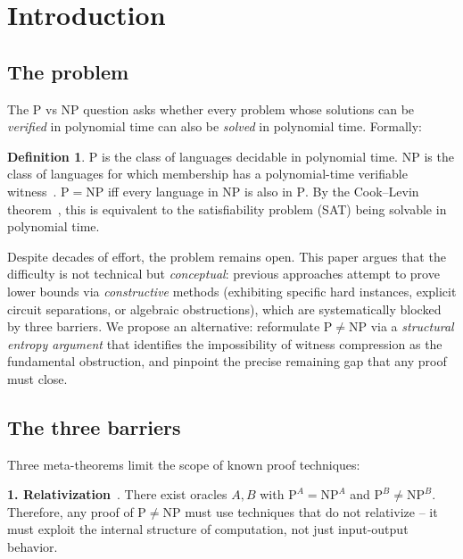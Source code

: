\documentclass[aps,prd,twocolumn,superscriptaddress,nofootinbib]{revtex4-2}
\theoremstyle{definition}
\newtheorem{definition}[theorem]{Definition}
\theoremstyle{remark}
\newcommand{\NP}{\mathrm{NP}}
\newcommand{\PP}{\mathrm{P}}
\begin{document}
\section{Introduction}
\label{sec:intro}

\subsection{The problem}

The $\PP$ vs $\NP$ question asks whether every problem whose solutions can be \textit{verified} in polynomial time can also be \textit{solved} in polynomial time. Formally:

\begin{definition}
$\PP$ is the class of languages decidable in polynomial time. $\NP$ is the class of languages for which membership has a polynomial-time verifiable witness~\cite{Arora2009}. $\PP = \NP$ iff every language in $\NP$ is also in $\PP$. By the Cook--Levin theorem~\cite{Cook1971}, this is equivalent to the satisfiability problem (SAT) being solvable in polynomial time.
\end{definition}

Despite decades of effort, the problem remains open. This paper argues that the difficulty is not technical but \textit{conceptual}: previous approaches attempt to prove lower bounds via \textit{constructive} methods (exhibiting specific hard instances, explicit circuit separations, or algebraic obstructions), which are systematically blocked by three barriers. We propose an alternative: reformulate $\PP \neq \NP$ via a \textit{structural entropy argument} that identifies the impossibility of witness compression as the fundamental obstruction, and pinpoint the precise remaining gap that any proof must close.

\subsection{The three barriers}

Three meta-theorems limit the scope of known proof techniques:

\textbf{1. Relativization}~\cite{BakerGillSolovay1975}. There exist oracles $A, B$ with $\PP^A = \NP^A$ and $\PP^B \neq \NP^B$. Therefore, any proof of $\PP \neq \NP$ must use techniques that do not relativize -- it must exploit the internal structure of computation, not just input-output behavior.
\end{document}
